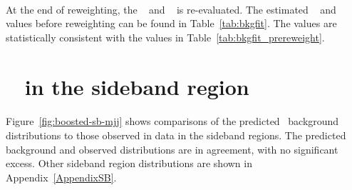 \paragraph{}
At the end of reweighting, the \muqcd~ and \alphatt~ is re-evaluated. The estimated \muqcd~ and \alphatt~ values before reweighting can be found in Table~\ref{tab:bkgfit}. 
The values are statistically consistent with the values in Table~\ref{tab:bkgfit_prereweight}.



\clearpage
\section{\mtwoJ~ in the sideband region}
\label{sec:boosted-sb}

\paragraph{}
Figure~\ref{fig:boosted-sb-mjj} shows comparisons of the predicted \mtwoJ~background distributions to those observed in data in the sideband regions.
The predicted background and observed distributions are in agreement, with no significant excess.
Other sideband region distributions are shown in Appendix~\ref{AppendixSB}.

